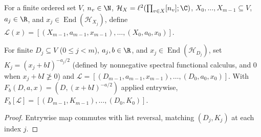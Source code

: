 \begin{definition}
    \label{def:peps_ordered_patch_factor_list}
    \leanok
    For a finite ordered set $V$, $n_v\in\N$, $\mathcal H_X=\ell^2(\prod_{v\in X}[n_v];\C)$,
    $X_0,\ldots,X_{m-1}\subseteq V$, $a_j\in\R$,
    and $x_j\in\operatorname{End}(\mathcal H_{X_j})$, define
    $\mathcal L(x)=[(X_{m-1},a_{m-1},x_{m-1}),\ldots,(X_0,a_0,x_0)]$.
\end{definition}

\begin{lemma}
    \label{thm:peps_patch_factor_chain_list}
    \leanok
    For finite $D_j\subseteq V$ ($0\le j<m$), $a_j,b\in\R$, and $x_j\in\operatorname{End}(\mathcal H_{D_j})$, set
    $K_j=(x_j+bI)^{-a_j/2}$ (defined by nonnegative spectral functional calculus, and $0$ when $x_j+bI\not\ge0$) and
    $\mathcal L=[(D_{m-1},a_{m-1},x_{m-1}),\ldots,(D_0,a_0,x_0)]$.
    With $F_b(D,a,x)=(D,(x+bI)^{-a/2})$ applied entrywise,
    $F_b[\mathcal L]=[(D_{m-1},K_{m-1}),\ldots,(D_0,K_0)]$.
\end{lemma}
\begin{proof}
    \leanok
    Entrywise map commutes with list reversal, matching $(D_j,K_j)$ at each index $j$.
\end{proof}

